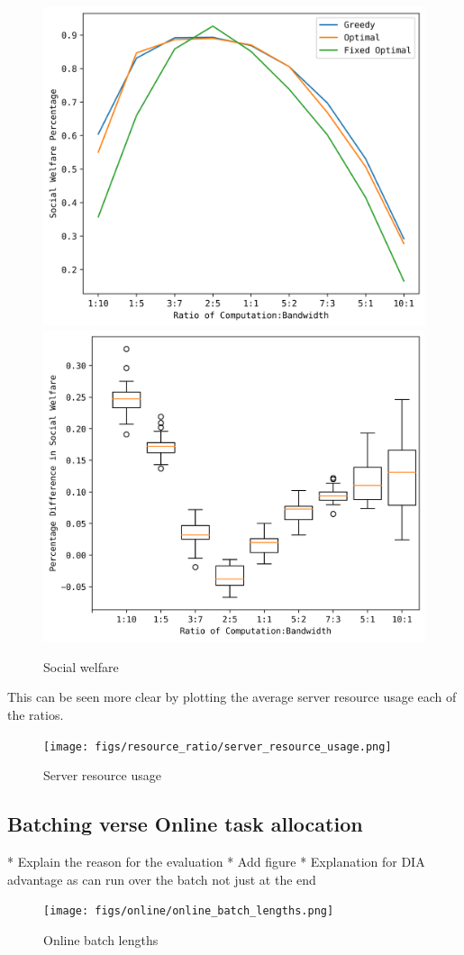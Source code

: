 \begin{figure}[h]
    \centering
    \includegraphics[width=0.45\linewidth]{figs/resource_ratio/social_welfare_percentage.png}
    \includegraphics[width=0.45\linewidth]{figs/resource_ratio/social_welfare_difference.png}
    \caption{Social welfare}
    \label{fig:resource-ratio-social-welfare}
\end{figure}

This can be seen more clear by plotting the average server resource usage each of the ratios.
\begin{figure}[h]
    \centering
    \texttt{[image: figs/resource\_ratio/server\_resource\_usage.png]}
    \caption{Server resource usage}
    \label{fig:resource-ratio-server-resource-usage}
\end{figure}

\subsection{Batching verse Online task allocation}
\label{subsec:batching-verse-online-task-allocation}
* Explain the reason for the evaluation
* Add figure
* Explanation for DIA advantage as can run over the batch not just at the end

\begin{figure}[h]
    \centering
    \texttt{[image: figs/online/online\_batch\_lengths.png]}
    \caption{Online batch lengths}
    \label{fig:batch-task-allocation}
\end{figure}